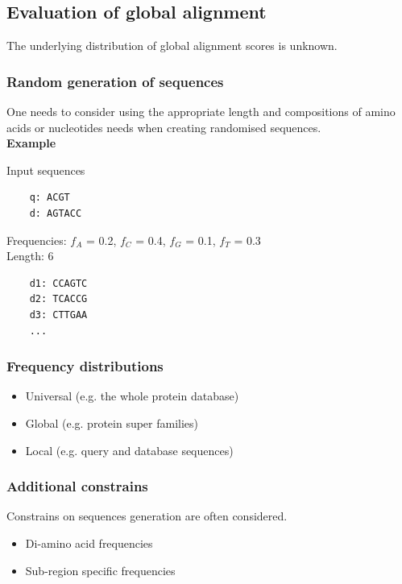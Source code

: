%
%

%
%
\subsection{Evaluation of global alignment}
The underlying distribution of global alignment scores is unknown.

%
%
\subsubsection*{Random generation of sequences} 
One needs to consider using the appropriate length and compositions of amino acids or nucleotides needs when creating randomised sequences. \\

\noindent
\textbf{Example}

\noindent
Input sequences
\begin{verbatim}
    q: ACGT
    d: AGTACC  
\end{verbatim}

\noindent
Frequencies: {$f_{A}$ = 0.2, $f_{C}$ = 0.4, $f_{G}$ = 0.1, $f_{T}$ = 0.3} \\
Length: 6

\begin{verbatim}
    d1: CCAGTC
    d2: TCACCG
    d3: CTTGAA
    ...
\end{verbatim}

%
%
\subsubsection*{Frequency distributions} 
\begin{itemize}
\item Universal (e.g. the whole protein database)
\item Global (e.g. protein super families)
\item Local (e.g. query and database sequences)
\end{itemize}

%
%
\subsubsection*{Additional constrains} 
Constrains on sequences generation are often considered. 
\begin{itemize}
\item Di-amino acid frequencies
\item Sub-region specific frequencies
\end{itemize}

